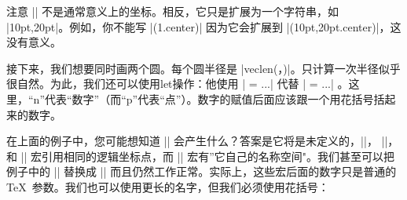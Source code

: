 
注意 || 不是通常意义上的坐标。相反，它只是扩展为一个字符串，如 |10pt,20pt|。例如，你不能写 |(\p1.center)| 因为它会扩展到 |(10pt,20pt.center)|，这没有意义。


接下来，我们想要同时画两个圆。每个圆半径是 |veclen(，)|。只计算一次半径似乎很自然。为此，我们还可以使用let操作：他使用 | = ...| 代替 | = ...| 。这里，``n''代表``数字''（而``p''代表``点''）。数字的赋值后面应该跟一个用花括号括起来的数字。

%
\begin{codeexample}[preamble={\usetikzlibrary{calc}}]
\end{codeexample}
%

在上面的例子中，您可能想知道 || 会产生什么？答案是它将是未定义的，|\p|， |\x|，和 |\y| 宏引用相同的逻辑坐标点，而 |\n| 宏有''它自己的名称空间"。我们甚至可以把例子中的 || 替换成 || 而且仍然工作正常。实际上，这些宏后面的数字只是普通的\TeX\ 参数。我们也可以使用更长的名字，但我们必须使用花括号：

